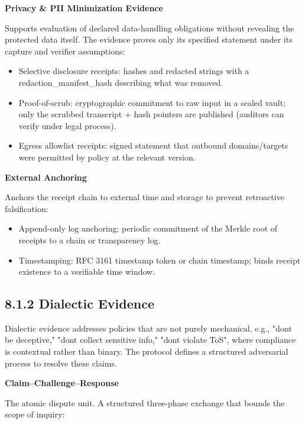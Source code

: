 \documentclass[
  11pt,
]{article}
\providecommand{\tightlist}{%
  \setlength{\itemsep}{0pt}\setlength{\parskip}{0pt}}
\begin{document}
\textbf{Privacy \& PII Minimization Evidence}

Supports evaluation of declared data-handling obligations without revealing
the protected data itself. The evidence proves only its specified statement
under its capture and verifier assumptions:

\begin{itemize}
\tightlist
\item
  Selective disclosure receipts: hashes and redacted strings with a
  redaction\_manifest\_hash describing what was removed.
\item
  Proof-of-scrub: cryptographic commitment to raw input in a sealed
  vault; only the scrubbed transcript + hash pointers are published
  (auditors can verify under legal process).
\item
  Egress allowlist receipts: signed statement that outbound
  domains/targets were permitted by policy at the relevant version.
\end{itemize}

\textbf{External Anchoring}

Anchors the receipt chain to external time and storage to prevent
retroactive falsification:

\begin{itemize}
\tightlist
\item
  Append-only log anchoring: periodic commitment of the Merkle root of
  receipts to a chain or transparency log.
\item
  Timestamping: RFC 3161 timestamp token or chain timestamp; binds
  receipt existence to a verifiable time window.
\end{itemize}

\hypertarget{dialectic-evidence}{%
\subsection{8.1.2 Dialectic Evidence}\label{dialectic-evidence}}

Dialectic evidence addresses policies that are not purely mechanical,
e.g., "don\textquotesingle t be deceptive," "don\textquotesingle t
collect sensitive info," "don\textquotesingle t violate ToS", where
compliance is contextual rather than binary. The protocol defines a
structured adversarial process to resolve these claims.

\textbf{Claim--Challenge--Response}

The atomic dispute unit. A structured three-phase exchange that bounds
the scope of inquiry:
\end{document}
